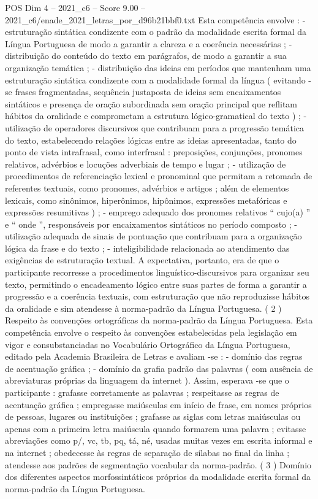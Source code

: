 \begin{textsample}{POS Dim 4 – 2021\_c6 – Score 9.00 – 2021\_c6/enade\_2021\_letras\_por\_d96b21bbf0.txt}
Esta competência envolve : - estruturação sintática condizente com o padrão da modalidade escrita formal da Língua Portuguesa de modo a garantir a clareza e a coerência necessárias ; - distribuição do conteúdo do texto em parágrafos, de modo a garantir a sua organização temática ; - distribuição das ideias em períodos que mantenham uma estruturação sintática condizente com a modalidade formal da língua ( evitando -se frases fragmentadas, sequência justaposta de ideias sem encaixamentos sintáticos e presença de oração subordinada sem oração principal que reflitam hábitos da oralidade e comprometam a estrutura lógico-gramatical do texto ) ; - utilização de operadores discursivos que contribuam para a progressão temática do texto, estabelecendo relações lógicas entre as ideias apresentadas, tanto do ponto de vista intrafrasal, como interfrasal : preposições, conjunções, pronomes relativos, advérbios e locuções adverbiais de tempo e lugar ; - utilização de procedimentos de referenciação lexical e pronominal que permitam a retomada de referentes textuais, como pronomes, advérbios e artigos ; além de elementos lexicais, como sinônimos, hiperônimos, hipônimos, expressões metafóricas e expressões resumitivas ) ; - emprego adequado dos pronomes relativos “ cujo(a) ” e “ onde ”, responsáveis por encaixamentos sintáticos no período composto ; - utilização adequada de sinais de pontuação que contribuam para a organização lógica da frase e do texto ; - inteligibilidade relacionada ao atendimento das exigências de estruturação textual.
A expectativa, portanto, era de que o participante recorresse a procedimentos linguístico-discursivos para organizar seu texto, permitindo o encadeamento lógico entre suas partes de forma a garantir a progressão e a coerência textuais, com estruturação que não reproduzisse hábitos da oralidade e sim atendesse à norma-padrão da Língua Portuguesa. ( 2 ) Respeito às convenções ortográficas da norma-padrão da Língua Portuguesa.
Esta competência envolve o respeito às convenções estabelecidas pela legislação em vigor e consubstanciadas no Vocabulário Ortográfico da Língua Portuguesa, editado pela Academia Brasileira de Letras e avaliam -se : - domínio das regras de acentuação gráfica ; - domínio da grafia padrão das palavras ( com ausência de abreviaturas próprias da linguagem da internet ).
Assim, esperava -se que o participante : grafasse corretamente as palavras ; respeitasse as regras de acentuação gráfica ; empregasse maiúsculas em início de frase, em nomes próprios de pessoas, lugares ou instituições ; grafasse as siglas com letras maiúsculas ou apenas com a primeira letra maiúscula quando formarem uma palavra ; evitasse abreviações como p/, vc, tb, pq, tá, né, usadas muitas vezes em escrita informal e na internet ; obedecesse às regras de separação de sílabas no final da linha ; atendesse aos padrões de segmentação vocabular da norma-padrão. ( 3 ) Domínio dos diferentes aspectos morfossintáticos próprios da modalidade escrita formal da norma-padrão da Língua Portuguesa.

\end{textsample}
